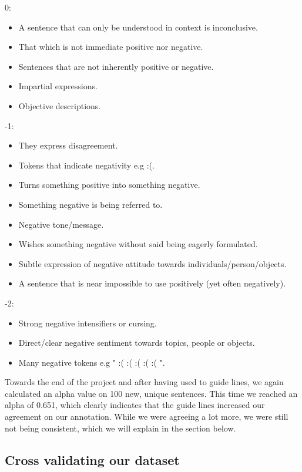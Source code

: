 0:
\begin{itemize}
	\itemsep-0.3em
	\item A sentence that can only be understood in context is inconclusive.
	\item That which is not immediate positive nor negative.
	\item Sentences that are not inherently positive or negative.
	\item Impartial expressions.
	\item Objective descriptions.
\end{itemize}
-1:
\begin{itemize}
	\itemsep-0.3em
	\item They express disagreement.
	\item Tokens that indicate negativity e.g :(.
	\item Turns something positive into something negative.
	\item Something negative is being referred to.
	\item Negative tone/message.
	\item Wishes something negative without said being eagerly formulated.
	\item Subtle expression of negative attitude towards individuals/person/objects.
	\item A sentence that is near impossible to use positively (yet often negatively).
\end{itemize}
-2:
\begin{itemize}
	\itemsep-0.3em
	\item Strong negative intensifiers or cursing.
	\item Direct/clear negative sentiment towards topics, people or objects.
	\item Many negative tokens e.g " :( :( :( :( :( ".
\end{itemize}

Towards the end of the project and after having used to guide lines, we again calculated an alpha value on 100 new, unique sentences. This time we reached an alpha of 0.651, which clearly indicates that the guide lines increased our agreement on our annotation. While we were agreeing a lot more, we were still not being consistent, which we will explain in the section below.

\subsection{Cross validating our dataset}

